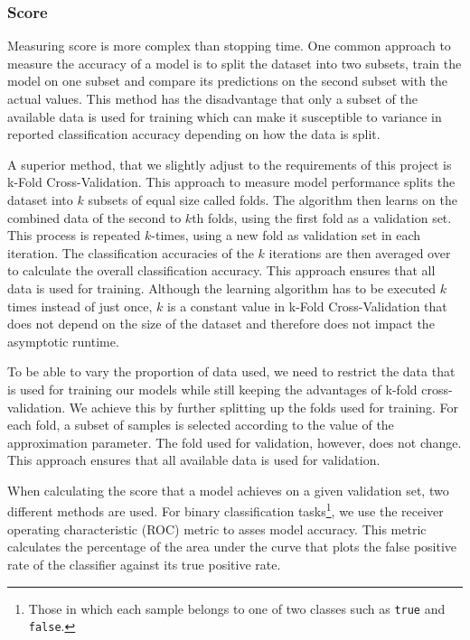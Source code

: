 \documentclass[a4paper,12pt,twoside,openright]{report}
\begin{document}
\subsubsection{Score}

Measuring score is more complex than stopping time. One common approach to measure the accuracy of a model is to split the dataset into two subsets, train the model on one subset and compare its predictions on the second subset with the actual values. This method has the disadvantage that only a subset of the available data is used for training which can make it susceptible to variance in reported classification accuracy depending on how the data is split.

A superior method, that we slightly adjust to the requirements of this project is k-Fold Cross-Validation. This approach to measure model performance splits the dataset into $k$ subsets of equal size called folds. The algorithm then learns on the combined data of the second to $k$th folds, using the first fold as a validation set. This process is repeated $k$-times, using a new fold as validation set in each iteration. The classification accuracies of the $k$ iterations are then averaged over to calculate the overall classification accuracy. This approach ensures that all data is used for training. Although the learning algorithm has to be executed $k$ times instead of just once, $k$ is a constant value in k-Fold Cross-Validation that does not depend on the size of the dataset and therefore does not impact the asymptotic runtime.

To be able to vary the proportion of data used, we need to restrict the data that is used for training our models while still keeping the advantages of k-fold cross-validation. We achieve this by further splitting up the folds used for training. For each fold, a subset of samples is selected according to the value of the approximation parameter. The fold used for validation, however, does not change. This approach ensures that all available data is used for validation.

When calculating the score that a model achieves on a given validation set, two different methods are used. For binary classification tasks\footnote{Those in which each sample belongs to one of two classes such as \texttt{true} and \texttt{false}.}, we use the receiver operating characteristic (ROC) metric to asses model accuracy. This metric calculates the percentage of the area under the curve that plots the false positive rate of the classifier against its true positive rate. 
\end{document}
